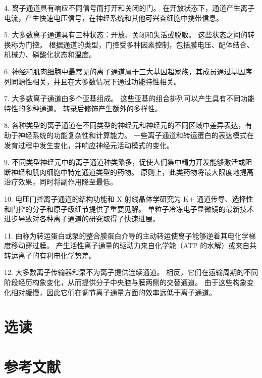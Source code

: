 4. 离子通道具有响应不同信号而打开和关闭的门。 在开放状态下，通道产生离子电流，产生快速电压信号，在神经系统和其他可兴奋细胞中携带信息。 

5. 大多数离子通道具有三种状态：开放、关闭和失活或脱敏。 这些状态之间的转换称为门控。 根据通道的类型，门控受多种因素控制，包括膜电压、配体结合、机械力、磷酸化状态和温度。 

6. 神经和肌肉细胞中最常见的离子通道属于三大基因超家族，其成员通过基因序列同源性相关，并且在大多数情况下通过功能特性相关。 

7. 大多数离子通道由多个亚基组成。 这些亚基的组合排列可以产生具有不同功能特性的多种通道。 转录后修饰产生额外的多样性。 

8. 各种类型的离子通道在不同类型的神经元和神经元的不同区域中差异表达，有助于神经系统的功能复杂性和计算能力。 一些离子通道和转运蛋白的表达模式在发育过程中发生变化，并响应神经元活动模式的变化。 

9. 不同类型神经元中的离子通道种类繁多，促使人们集中精力开发能够激活或阻断神经和肌肉细胞中特定通道类型的药物。 原则上，此类药物将最大限度地提高治疗效果，同时将副作用降至最低。 

10. 电压门控离子通道的结构功能和 X 射线晶体学研究为 K+ 通道传导、选择性和门控的分子和原子级细节提供了重要见解。 单粒子冷冻电子显微镜的最新技术进步导致对各种离子通道的研究取得了快速进展。 

11. 由称为转运蛋白或泵的整合膜蛋白介导的主动转运使离子能够逆着其电化学梯度移动穿过膜。 产生活性离子通量的驱动力来自化学能（ATP 的水解）或来自共转运离子的有利电化学势差。 

12. 大多数离子传输器和泵不为离子提供连续通道。 相反，它们在运输周期的不同阶段经历构象变化，从而提供分子中央腔与膜两侧的交替通道。 由于这些构象变化相对缓慢，因此它们在调节离子通量方面的效率远低于离子通道。

\section{选读}

\section{参考文献}
